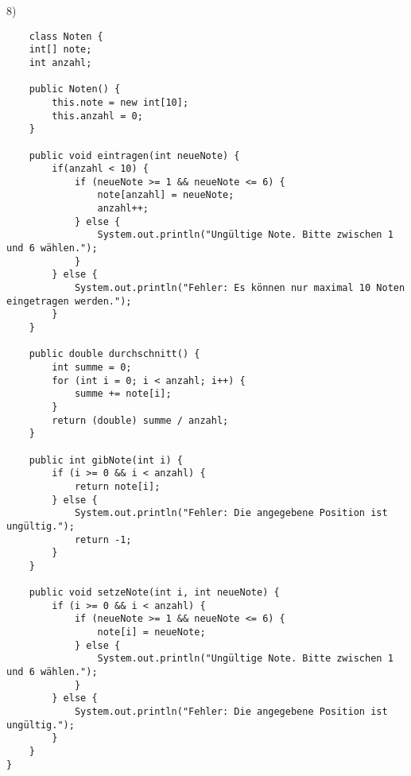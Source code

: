 \documentclass[fontsize=12pt]{article}
\begin{document}
8) 
\begin{verbatim}
    class Noten {
    int[] note;
    int anzahl;

    public Noten() {
        this.note = new int[10];
        this.anzahl = 0;
    }

    public void eintragen(int neueNote) {
        if(anzahl < 10) {
            if (neueNote >= 1 && neueNote <= 6) {
                note[anzahl] = neueNote;
                anzahl++;
            } else {
                System.out.println("Ungültige Note. Bitte zwischen 1 und 6 wählen.");
            }
        } else {
            System.out.println("Fehler: Es können nur maximal 10 Noten eingetragen werden.");
        }
    }

    public double durchschnitt() {
        int summe = 0;
        for (int i = 0; i < anzahl; i++) {
            summe += note[i];
        }
        return (double) summe / anzahl;
    }

    public int gibNote(int i) {
        if (i >= 0 && i < anzahl) {
            return note[i];
        } else {
            System.out.println("Fehler: Die angegebene Position ist ungültig.");
            return -1;
        }
    }

    public void setzeNote(int i, int neueNote) {
        if (i >= 0 && i < anzahl) {
            if (neueNote >= 1 && neueNote <= 6) {
                note[i] = neueNote;
            } else {
                System.out.println("Ungültige Note. Bitte zwischen 1 und 6 wählen.");
            }
        } else {
            System.out.println("Fehler: Die angegebene Position ist ungültig.");
        }
    }
}

\end{verbatim}
\end{document}
